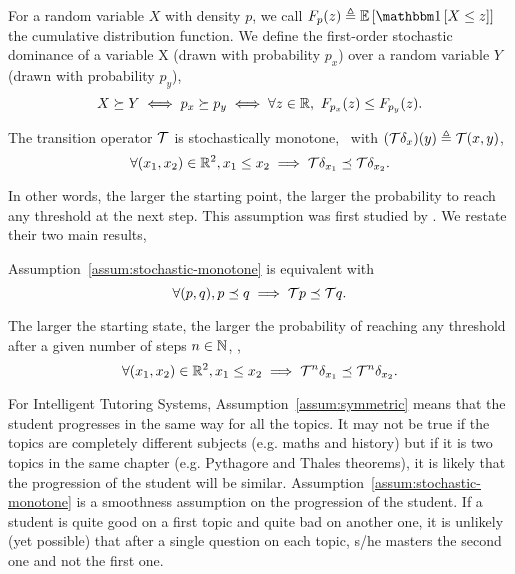 For a random variable $X$ with density $p$, we call $F_{p}(z) \triangleq \EE{\ind{X\leq z}}$ the cumulative distribution function. We define the first-order stochastic dominance of a variable X (drawn with probability $p_x$) over a random variable $Y$ (drawn with probability $p_y$),
\begin{equation}
\label{eq:stoch-dominance}
   X \succeq Y \iff p_x \succeq p_y \iff \forall z \in \mathbb{R},\  F_{p_x}(z) \leq F_{p_y}(z). 
\end{equation}

\begin{assumption}
\label{assum:stochastic-monotone}
The transition operator $\mathcal{T}$ is stochastically monotone, \ie \ with $(\mathcal{T}\delta_x)(y) \triangleq \mathcal{T}(x,y)$,
\[
\forall (x_1,x_2)\in \mathbb{R}^2, x_1 \leq x_2 \implies  \mathcal{T}\delta_{x_1} \preceq \mathcal{T}\delta_{x_2}.
\]
\end{assumption}

In other words, the larger the starting point, the larger the probability to reach any threshold at the next step. This assumption was first studied by \citet{daley1968stochastically}. We restate their two main results,

\begin{lemma}
\label{lem:daley}
Assumption~\ref{assum:stochastic-monotone} is equivalent with 
\[
\forall (p,q), p \preceq q \implies  \mathcal{T} p \preceq \mathcal{T} q.
\]
\end{lemma}

\begin{corollary}
\label{cor:daley}
The larger the starting state, the larger the probability of reaching any threshold after a given number of steps $n\in {\mathbb N}$, \ie, 
\[
\forall (x_1,x_2)\in \mathbb{R}^2, x_1 \leq x_2 \implies  \mathcal{T}^n\delta_{x_1} \preceq \mathcal{T}^n\delta_{x_2}.
\]
\end{corollary}
For Intelligent Tutoring Systems, Assumption~\ref{assum:symmetric} means that the student progresses in the same way for all the topics. It may not be true if the topics are completely different subjects (e.g. maths and history) but if it is two topics in the same chapter (e.g. Pythagore and Thales theorems), it is likely that the progression of the student will be similar. Assumption~\ref{assum:stochastic-monotone} is a smoothness assumption on the progression of the student. If a student is quite good on a first topic and quite bad on another one, it is unlikely (yet possible) that after a single question on each topic, s/he masters the second one and not the first one. 

